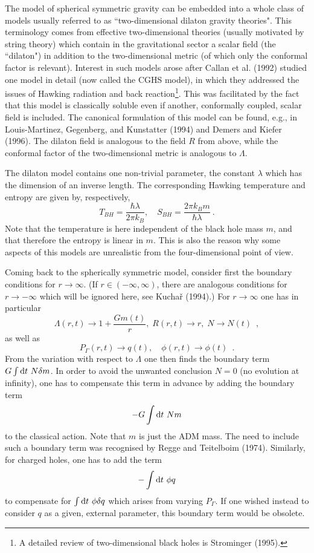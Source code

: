 \documentclass[12pt]{article}
\def\D{{\rm d}}
\newcommand{\be}{\begin{equation}}
\newcommand{\ee}{\end{equation}}
\begin{document}
The model of spherical symmetric gravity can be embedded into a
whole class of models usually referred to as ``two-dimensional
dilaton gravity theories". This terminology comes from effective
two-dimensional theories (usually motivated by string theory)
 which contain in the gravitational sector
 a scalar field (the ``dilaton") in addition to
the two-dimensional metric (of which only the conformal factor
is relevant). 
Interest in such models arose after Callan et al. (1992) studied
one model in detail (now called the CGHS model), in which they
addressed the issues of Hawking radiation
 and back reaction\footnote{A detailed review
 of two-dimensional black holes
is Strominger (1995).}.
This was facilitated by the fact that this model is classically
soluble even if another, conformally coupled, scalar field
is included. The canonical formulation of this model can be found,
e.g., in Louis-Martinez, Gegenberg, and Kunstatter (1994) and
Demers and Kiefer (1996). The dilaton field is analogous
to the field $R$ from above, while the conformal factor of the
two-dimensional metric is analogous to $\Lambda$.

\vskip 2mm
The dilaton model contains one non-trivial parameter, the
constant $\lambda$ which has the dimension of an inverse length.
The corresponding Hawking temperature and entropy are given by,
respectively,
\[ T_{BH}=\frac{\hbar\lambda}{2\pi k_B},\quad
   S_{BH}=\frac{2\pi k_B m}{\hbar\lambda}\ . \]
Note that the temperature is here independent of the black hole
mass $m$, and that therefore the entropy is linear in $m$.
This is also the reason why some aspects of this models
are unrealistic from the four-dimensional point of view.

\vskip 2mm
\normalsize

Coming back to the spherically symmetric model, consider first
the boundary conditions for $r\to\infty$. (If $r\in(-\infty,\infty)$,
there are analogous conditions for $r\to-\infty$ which will be
ignored here, see Kucha\v{r} (1994).) For $r\to\infty$ one has
in particular
\be \Lambda(r,t)\to 1+\frac{Gm(t)}{r},\; R(r,t)\to r,\;
    N\to N(t) \enspace, \ee
as well as
\be P_{\Gamma}(r,t)\to q(t), \quad \phi(r,t)\to \phi(t) \enspace .\ee
{}From the variation with respect to $\Lambda$ one then finds the
boundary term \\ $G\int \D t\ N\delta m$. In order to avoid the unwanted
conclusion $N=0$ (no evolution at infinity), one has to
compensate this term in advance by adding the boundary term
\[ -G\int\D t\ Nm \]
to the classical action. Note that $m$ is just the ADM mass.
The need to include such a boundary term was recognised by
Regge and Teitelboim (1974).
Similarly, for charged holes, one has to add the term
\[ -\int\D t\ \phi q \]
to compensate for $\int \D t\ \phi\delta q$ which arises from
varying $P_{\Gamma}$. If one wished instead to consider $q$ as a given,
external parameter, this boundary term would be obsolete.
\end{document}
